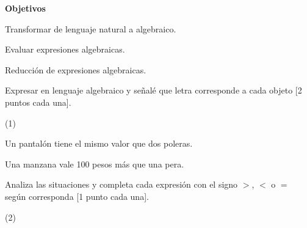 \documentclass[sin curso]{plantilla-guia-v1}
\begin{document}
 

\textbf{Objetivos}
\begin{lista}
  \item Transformar de lenguaje natural a algebraico.
  \item Evaluar expresiones algebraicas.
  \item Reducción de expresiones algebraicas.  
\end{lista}


\begin{enumerar}
  \item Expresar en lenguaje algebraico y señalé que letra corresponde a cada objeto [2 puntos cada una].
  \begin{ejercicios}(1)
    \item Un pantalón tiene el mismo valor que dos poleras.
    \begin{respuesta}[height=1.5cm]
    \end{respuesta}
    \item Una manzana vale 100 pesos más que una pera.
    \begin{respuesta}[height=1.5cm]
    \end{respuesta}
  \end{ejercicios}

  \item Analiza las situaciones y completa cada expresión con el signo \(>\), \(<\) o \(=\) según corresponda [1 punto cada una].
  \begin{ejercicios}(2)
    \item {}
    \item {}
    \item {}
    \item {}
  \end{ejercicios}


\end{enumerar}
\end{document}
